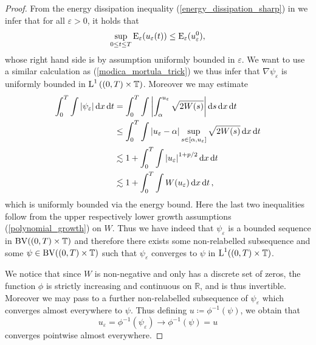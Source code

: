 \begin{proof}
	From the energy dissipation inequality (\ref{energy_dissipation_sharp}) in  we infer that for all $ \varepsilon > 0 $, it holds that
	\begin{equation}
		\label{unif_bound_on_energies}
		\sup_{ 0 \leq t \leq T }
		\operatorname{E}_{ \varepsilon } ( u_{ \varepsilon } ( t ) ) 
		\leq
		\operatorname{E}_{ \varepsilon } ( u_{ \varepsilon}^{ 0 } ),
	\end{equation}
	whose right hand side is by assumption uniformly bounded in $ \varepsilon $.
	We want to use a similar calculation as (\ref{modica_mortula_trick}) we thus infer that $ \nabla \psi_{ \varepsilon } $ is uniformly bounded in $ \operatorname{L}^{ 1 } \left( ( 0 , T ) \times \operatorname{\mathbb{T}} \right) $.
	Moreover we may estimate
	\begin{align}
		\int_{ 0 }^{ T }
		\int
		\abs{ \psi_{ \varepsilon } }
		\dd{ x }
		\dd{ t }
		& =
		\int_{ 0 }^{ T }
		\int
		\abs{
			\int_{ \alpha }^{ u_{ \varepsilon } }
			\sqrt{ 2 W ( s ) }
		}
		\dd{ s }
		\dd{ x }
		\dd{ t }
		\notag
		\\
		& \leq
		\int_{ 0 }^{ T }
		\int
		\abs{ u_{ \varepsilon } - \alpha }
		\sup_{ s \in [ \alpha, u_{ \varepsilon } ] }
		\sqrt{ 2 W ( s ) }
		\dd{ x }
		\dd{ t }
		\notag
		\\
		& \lesssim
		1 + 
		\int_{ 0 }^{ T }
		\int
		\abs{ u_{ \varepsilon } }^{ 1 + p/ 2 }
		\dd{ x }
		\dd{ t }
		\notag
		\\
		& \lesssim
		1 + 
		\int_{ 0 }^{ T }
		\int
		W ( u_{ \varepsilon } )
		\dd{ x }
		\dd{ t },
		\label{l1_estimate_for_psi_epsilon}
	\end{align}
	which is uniformly bounded via the energy bound. Here the last two inequalities follow from the upper respectively lower growth assumptions (\ref{polynomial_growth}) on $ W $. Thus we have indeed that $ \psi_{ \varepsilon } $ is a bounded sequence in $ \operatorname{BV}( ( 0 , T ) \times \operatorname{\mathbb{T}} ) $ and therefore there exists some non-relabelled subsequence and some $ \psi \in \operatorname{BV} ( ( 0 , T ) \times \operatorname{\mathbb{T}} ) $ such that $ \psi_{ \varepsilon } $ converges to $ \psi $ in $ \operatorname{L}^{ 1 } ( ( 0 , T ) \times \operatorname{\mathbb{T}} ) $.
	
	We notice that since $ W $ is non-negative and only has a discrete set of zeros, the function $ \phi $ is strictly increasing and continuous on $ \mathbb{ R } $, and is thus invertible. Moreover we may pass to a further non-relabelled subsequence of $ \psi_{ \varepsilon } $ which converges almost everywhere to $ \psi $. 
	Thus defining $ u \coloneqq \phi^{ - 1 } ( \psi ) $, we obtain that
	\begin{equation*}
		u_{ \varepsilon } = \phi^{ - 1 } ( \psi_{ \varepsilon } ) \to \phi^{ - 1 } ( \psi ) = u
	\end{equation*}
	converges pointwise almost everywhere.
	

\end{proof}
